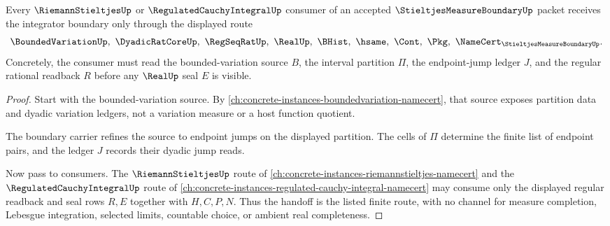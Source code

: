 \begin{theorem}
\label{thm:stieltjes-measure-boundary-bounded-variation-handoff}
Every $\RiemannStieltjesUp$ or $\RegulatedCauchyIntegralUp$ consumer of an accepted $\StieltjesMeasureBoundaryUp$ packet receives the integrator boundary only through the displayed route
$$
\BoundedVariationUp,\ \DyadicRatCoreUp,\ \RegSeqRatUp,\ \RealUp,\ \BHist,\ \hsame,\ \Cont,\ \Pkg,\ \NameCert_{\StieltjesMeasureBoundaryUp}.
$$
Concretely, the consumer must read the bounded-variation source $B$, the interval partition $\Pi$, the endpoint-jump ledger $J$, and the regular rational readback $R$ before any $\RealUp$ seal $E$ is visible.
\end{theorem}
\begin{proof}
Start with the bounded-variation source. By \autoref{ch:concrete-instances-boundedvariation-namecert}, that source exposes partition data and dyadic variation ledgers, not a variation measure or a host function quotient.

The boundary carrier refines the source to endpoint jumps on the displayed partition. The cells of $\Pi$ determine the finite list of endpoint pairs, and the ledger $J$ records their dyadic jump reads.

Now pass to consumers. The $\RiemannStieltjesUp$ route of \autoref{ch:concrete-instances-riemannstieltjes-namecert} and the $\RegulatedCauchyIntegralUp$ route of \autoref{ch:concrete-instances-regulated-cauchy-integral-namecert} may consume only the displayed regular readback and seal rows $R,E$ together with $H,C,P,N$. Thus the handoff is the listed finite route, with no channel for measure completion, Lebesgue integration, selected limits, countable choice, or ambient real completeness.
\end{proof}

